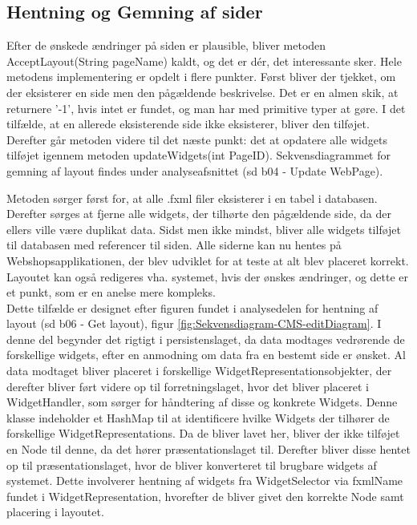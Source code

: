 \subsection{Hentning og Gemning af sider}
Efter de ønskede ændringer på siden er plausible, bliver metoden AcceptLayout(String pageName) kaldt, og det er dér, det interessante sker.
Hele metodens implementering er opdelt i flere punkter. Først bliver der tjekket, om der eksisterer en side men den pågældende beskrivelse. Det er en almen skik, at returnere ’-1’, hvis intet er fundet, og man har med primitive typer at gøre. I det tilfælde, at en allerede eksisterende side ikke eksisterer, bliver den tilføjet. Derefter går metoden videre til det næste punkt: det at opdatere alle widgets tilføjet igennem metoden updateWidgets(int PageID). Sekvensdiagrammet for gemning af layout findes under analyseafsnittet (sd b04 - Update WebPage).

Metoden sørger først for, at alle .fxml filer eksisterer i en tabel i databasen. Derefter sørges at fjerne alle widgets, der tilhørte den pågældende side, da der ellers ville være duplikat data. Sidst men ikke mindst, bliver alle widgets tilføjet til databasen med referencer til siden.
Alle siderne kan nu hentes på Webshopsapplikationen, der blev udviklet for at teste at alt blev placeret korrekt. Layoutet kan også redigeres vha. systemet, hvis der ønskes ændringer, og dette er et punkt, som er en anelse mere kompleks.
\\
Dette tilfælde er designet efter figuren fundet i analysedelen for hentning af layout (sd b06 - Get layout), figur \ref{fig:Sekvensdiagram-CMS-editDiagram}. I denne del begynder det rigtigt i persistenslaget, da data modtages vedrørende de forskellige widgets, efter en anmodning om data fra en bestemt side er ønsket. Al data modtaget bliver placeret i forskellige WidgetRepresentationsobjekter, der derefter bliver ført videre op til forretningslaget, hvor det bliver placeret i WidgetHandler, som sørger for håndtering af disse og konkrete Widgets. Denne klasse indeholder et HashMap til at identificere hvilke Widgets der tilhører de forskellige WidgetRepresentations. Da de bliver lavet her, bliver der ikke tilføjet en Node til denne, da det hører præsentationslaget til.
Derefter bliver disse hentet op til præsentationslaget, hvor de bliver konverteret til brugbare widgets af systemet. Dette involverer hentning af widgets fra WidgetSelector via fxmlName fundet i WidgetRepresentation, hvorefter de bliver givet den korrekte Node samt placering i layoutet. 

